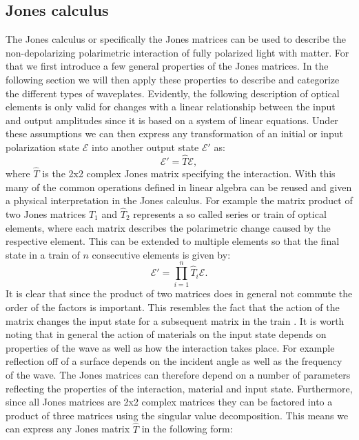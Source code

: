 
\subsection{Jones calculus}
\label{sec:jonescalc}
The Jones calculus or specifically the Jones matrices can be used to describe the non-depolarizing polarimetric interaction of fully polarized light with matter. For that we first introduce a few general properties of the Jones matrices. In the following section we will then apply these properties to describe and categorize the different types of waveplates. Evidently, the following description of optical elements is only valid for changes with a linear relationship between the input and output amplitudes since it is based on a system of linear equations. Under these assumptions we can then express any transformation of an initial or input polarization state $\bm{\mathcal{E}}$ into another output state $\bm{\mathcal{E}}'$ as:
\begin{equation}
    \bm{\mathcal{E}}' = \hat{T} \bm{\mathcal{E}},
\end{equation}
where $\hat{T}$ is the 2x2 complex Jones matrix specifying the interaction. With this many of the common operations defined in linear algebra can be reused and given a physical interpretation in the Jones calculus. For example the matrix product of two Jones matrices $\hat{T}_1$ and $\hat{T}_2$ represents a so called series or train of optical elements, where each matrix describes the polarimetric change caused by the respective element. This can be extended to multiple elements so that the final state in a train of $n$ consecutive elements is given by:
\begin{equation}
    \label{eq:jones_series_product}
    \bm{\mathcal{E}}' = \prod_{i=1}^{n} \hat{T}_i \bm{\mathcal{E}}.
\end{equation}
It is clear that since the product of two matrices does in general not commute the order of the factors is important. This resembles the fact that the action of the matrix changes the input state for a subsequent matrix in the train \cite{Jones1941ACalculus}. It is worth noting that in general the action of materials on the input state depends on properties of the wave as well as how the interaction takes place. For example reflection off of a surface depends on the incident angle as well as the frequency of the wave. The Jones matrices can therefore depend on a number of parameters reflecting the properties of the interaction, material and input state. Furthermore, since all Jones matrices are 2x2 complex matrices they can be factored into a product of three matrices using the singular value decomposition. This means we can express any Jones matrix $\hat{T}$ in the following form:

